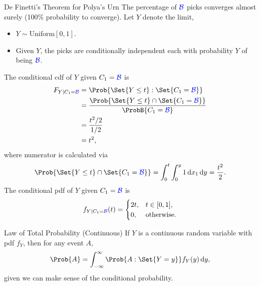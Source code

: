\begin{Theorem}{De Finetti's Theorem for Polya's Urn}{}
    The percentage of $ \textcolor{blue}{\mathcal{B}} $ picks converges almost surely
    (100\% probability to converge). Let $ Y $ denote the
    limit,
    \begin{itemize}
        \item $ Y \sim \text{Uniform}[0,1] $.
        \item Given $ Y $, the picks are conditionally
              independent each with probability $ Y $ of being
              $ \textcolor{blue}{\mathcal{B}} $.
    \end{itemize}
\end{Theorem}
\begin{Example}{}{}
    The conditional cdf of $ Y $ given $ C_1=\textcolor{blue}{\mathcal{B}} $ is
    \begin{align*}
        F_{Y\mid C_1=\B}
         & =\Prob{\Set{Y\le t}\given \Set{C_1=\B}}                      \\
         & =\frac{\Prob{\Set{Y\le t}\cap \Set{C_1=\B}}}{\ProbB{C_1=\B}} \\
         & =\frac{t^2/2}{1/2}                                           \\
         & =t^2,
    \end{align*}
    where numerator is calculated via
    \[ \Prob{\Set{Y\le t}\cap\Set{C_1=\B}}
        =\int_{0}^{t}\int_{0}^{y}1\odif{x_1}\odif{y}=\frac{t^2}{2}.
    \]
    The conditional pdf of $ Y $ given $ C_1=\textcolor{blue}{\mathcal{B}} $ is
    \[ f_{Y\mid C_1=\textcolor{blue}{\mathcal{B}}}(t)
        =\begin{cases} 2t, & t\in[0,1],        \\
              0,  & \text{otherwise}.\end{cases} \]
\end{Example}
\begin{Theorem}{Law of Total Probability (Continuous)}{}
    If $ Y $ is a continuous random variable with pdf $
        f_Y $, then for any event $ A $,
    \[ \Prob{A}=\int_{-\infty}^{\infty}\Prob{A\given
            \Set{Y=y}}f_Y(y)\odif{y}, \]
    given we can make sense of the conditional probability.
\end{Theorem}
